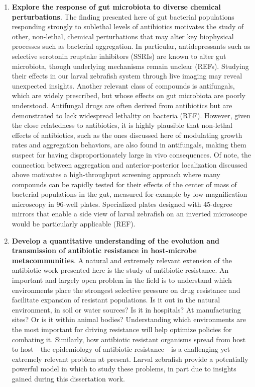\begin{enumerate}
\item 
\textbf{Explore the response of gut microbiota to diverse chemical perturbations}. The finding presented here of gut bacterial populations responding strongly to sublethal levels of antibiotics motivates the study of other, non-lethal, chemical perturbations that may alter key biophysical processes such as bacterial aggregation. In particular, antidepressants such as selective serotonin reuptake inhibitors (SSRIs) are known to alter gut microbiota, though underlying mechanisms remain unclear (REFs). Studying their effects in our larval zebrafish system through live imaging may reveal unexpected insights. Another relevant class of compounds is antifungals, which are widely prescribed, but whose effects on gut microbiota are poorly understood. Antifungal drugs are often derived from antibiotics but are demonstrated to lack widespread lethality on bacteria (REF). However, given the close relatedness to antibiotics, it is highly plausible that non-lethal effects of antibiotics, such as the ones discussed here of modulating growth rates and aggregation behaviors, are also found in antifungals, making them suspect for having disproportionately large in vivo consequences. Of note, the connection between aggregation and anterior-posterior localization discussed above motivates a high-throughput screening approach where many compounds can be rapidly tested for their effects of the center of mass of bacterial populations in the gut, measured for example by low-magnification microscopy in 96-well plates. Specialized plates designed with 45-degree mirrors that enable a side view of larval zebrafish on an inverted microscope would be particularly applicable (REF).

\item 
\textbf{Develop a quantitative understanding of the evolution and transmission of antibiotic resistance in host-microbe metacommunities}. A natural and extremely relevant extension of the antibiotic work presented here is the study of antibiotic resistance. An important and largely open problem in the field is to understand which environments place the strongest selective pressure on drug resistance and facilitate expansion of resistant populations. Is it out in the natural environment, in soil or water sources? Is it in hospitals? At manufacturing sites? Or is it within animal bodies? Understanding which environments are the most important for driving resistance will help optimize policies for combating it. Similarly, how antibiotic resistant organisms spread from host to host---the epidemiology of antibiotic resistance---is a challenging yet extremely relevant problem at present. Larval zebrafish provide a potentially powerful model in which to study these problems, in part due to insights gained during this dissertation work. 


\end{enumerate}
